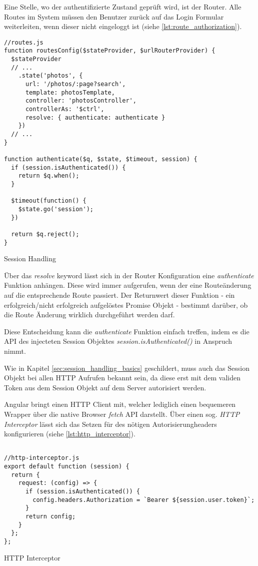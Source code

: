 Eine Stelle, wo der authentifizierte Zustand geprüft wird, ist der Router. Alle Routes im System müssen den Benutzer zurück auf das Login Formular weiterleiten, wenn dieser nicht eingeloggt ist (siehe \ref{lst:route_authorization}).

\begin{listing}[H]
\begin{verbatim}
//routes.js
function routesConfig($stateProvider, $urlRouterProvider) {
  $stateProvider
  // ...
    .state('photos', {
      url: '/photos/:page?search',
      template: photosTemplate,
      controller: 'photosController',
      controllerAs: '$ctrl',
      resolve: { authenticate: authenticate }
    })
  // ... 
}

function authenticate($q, $state, $timeout, session) {
  if (session.isAuthenticated()) {
    return $q.when();
  }

  $timeout(function() {
    $state.go('session');
  })

  return $q.reject();
}

\end{verbatim}
\caption{Session Handling}
\label{lst:route_authorization}
\end{listing}

Über das \textit{resolve} keyword lässt sich in der Router Konfiguration eine \textit{authenticate} Funktion anhängen. Diese wird immer aufgerufen, wenn der eine Routeänderung auf die entsprechende Route passiert. Der Returnwert dieser Funktion - ein erfolgreich/nicht erfolgreich aufgelöstes Promise Objekt - bestimmt darüber, ob die Route Änderung wirklich durchgeführt werden darf.

Diese Entscheidung kann die \textit{authenticate} Funktion einfach treffen, indem es die API des injecteten Session Objektes \textit{session.isAuthenticated()} in Anspruch nimmt.

Wie in Kapitel \ref{sec:session_handling_basics} geschildert, muss auch das Session Objekt bei allen HTTP Aufrufen bekannt sein, da diese erst mit dem validen Token aus dem Session Objekt auf dem Server autorisiert werden. 

Angular bringt einen HTTP Client mit, welcher lediglich einen bequemeren Wrapper über die native Browser \textit{fetch} API darstellt. Über einen sog. \textit{HTTP Interceptor} lässt sich das Setzen für des nötigen Autorisierungheaders konfigurieren (siehe \ref{lst:http_interceptor}).

\begin{listing}[H]
\begin{verbatim}

//http-interceptor.js
export default function (session) {
  return {
    request: (config) => {
      if (session.isAuthenticated()) {
        config.headers.Authorization = `Bearer ${session.user.token}`;
      }
      return config;
    }
  };
};

\end{verbatim}
\caption{HTTP Interceptor}
\label{lst:http_interceptor}
\end{listing}

